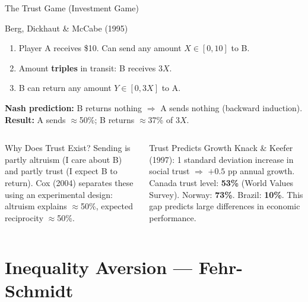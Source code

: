 \documentclass[aspectratio=169]{beamer}
\begin{document}
\begin{frame}{The Trust Game (Investment Game)}
\begin{block}{Berg, Dickhaut \& McCabe (1995)}
\begin{enumerate}
  \item Player A receives \$10. Can send any amount $X \in [0,10]$ to B.
  \item Amount \textbf{triples} in transit: B receives $3X$.
  \item B can return any amount $Y \in [0,3X]$ to A.
\end{enumerate}
\textbf{Nash prediction:} B returns nothing $\Rightarrow$ A sends nothing (backward induction).\\
\textbf{Result:} A sends $\approx$50\%; B returns $\approx$37\% of $3X$.
\end{block}
\begin{columns}
\begin{exampleblock}{Why Does Trust Exist?}
Sending is partly altruism (I care about B) and partly trust (I expect B to return). Cox (2004) separates these using an experimental design: altruism explains $\approx$50\%, expected reciprocity $\approx$50\%.
\end{exampleblock}
\begin{alertblock}{Trust Predicts Growth}
Knack \& Keefer (1997): 1 standard deviation increase in social trust $\Rightarrow$ $+0.5$ pp annual growth. Canada trust level: \textbf{53\%} (World Values Survey). Norway: \textbf{73\%}. Brazil: \textbf{10\%}. This gap predicts large differences in economic performance.
\end{alertblock}
\end{columns}
\end{frame}

\section{Inequality Aversion --- Fehr-Schmidt}
\end{document}
